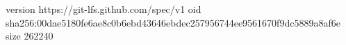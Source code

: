 version https://git-lfs.github.com/spec/v1
oid sha256:00dae5180fe6ae8c0b6ebd43646ebdec257956744ee9561670f9dc5889a8af6e
size 262240
